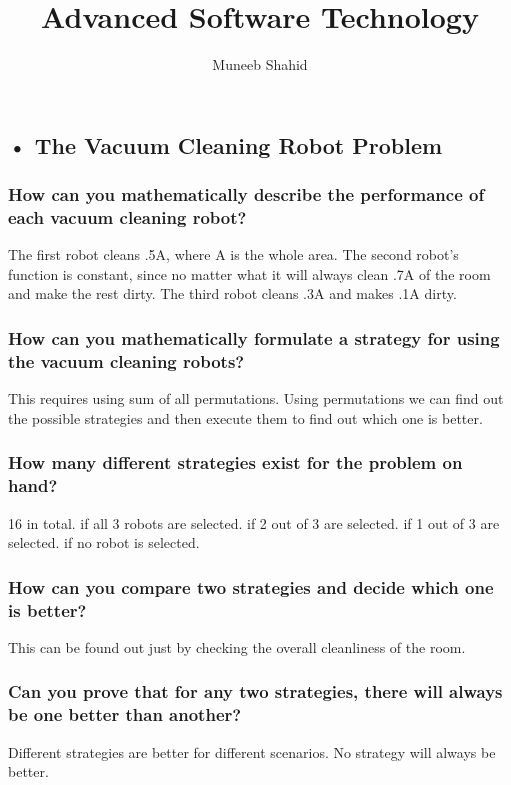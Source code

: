 \documentclass[a4paper,12pt]{article}
\title{Advanced Software Technology}
\author{Muneeb Shahid}
\begin{document}
\begin{titlepage}
\maketitle

\end{titlepage}

\subsection*{• The Vacuum Cleaning Robot Problem}
\subsubsection*{How can you mathematically describe the performance of each vacuum cleaning robot?}
The first robot cleans .5A, where A is the whole area. 
The second robot's function is constant, since no matter what it will always clean .7A of the room and make the rest dirty.
The third robot cleans .3A and makes .1A dirty.

\subsubsection*{How can you mathematically formulate a strategy for using the vacuum cleaning robots?}
This requires using sum of all permutations. Using permutations we can find out the possible strategies and then 
execute them to find out which one is better. 

\subsubsection*{How many different strategies exist for the problem on hand?}
16 in total. 
 if all 3 robots are selected. 
 if 2 out of 3 are selected.
 if 1 out of 3 are selected. 
 if no robot is selected.

\subsubsection*{How can you compare two strategies and decide which one is better?}
This can be found out just by checking the overall cleanliness of the room.

\subsubsection*{Can you prove that for any two strategies, there will always be one better than another?}
Different strategies are better for different scenarios. No strategy will always be better.
\end{document}
